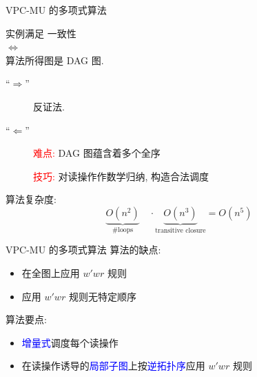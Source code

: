 \begin{frame}{VPC-MU 的多项式算法 \rwclosure{}}
  \begin{ctheorem}
	\begin{center}
	   实例满足 \PRAM{} 一致性\\
		$\iff$\\
	  \rwclosure{} 算法所得图是 DAG 图.
	\end{center}
  \end{ctheorem}

  \pause
  \vspace{0.20cm}

  \begin{cproof}
	\begin{description}
	  \item[``$\Longrightarrow$''] 反证法.
	  \item[``$\Longleftarrow$''] 
		\textcolor{red}{难点:} DAG 图蕴含着多个全序

		\textcolor{red}{技巧:} 对读操作作数学归纳, 构造合法调度
	\end{description}
  \end{cproof}

  \pause
  \vspace{0.30cm}

  \rwclosure{} 算法复杂度: 
  \[
    \underbrace{O(n^2)}_{\textrm{\#loops}} \quad\cdot
	\underbrace{O(n^3)}_{\textrm{transitive closure}}  = O(n^5)
  \]
\end{frame}
\begin{frame}{VPC-MU 的多项式算法 \readcentric{}}
  \rwclosure{} 算法的缺点:
  \begin{itemize}
	\item 在全图上应用 $w'wr$ 规则
	\item 应用 $w'wr$ 规则无特定顺序
  \end{itemize}

  \pause
  \vspace{0.50cm}

  \readcentric{} 算法要点:
  \begin{itemize}
	\item \textcolor{blue}{增量式}调度每个读操作
	\item 在读操作诱导的\textcolor{blue}{局部子图}上按\textcolor{blue}{逆拓扑序}应用 $w'wr$ 规则
  \end{itemize}
\end{frame}
